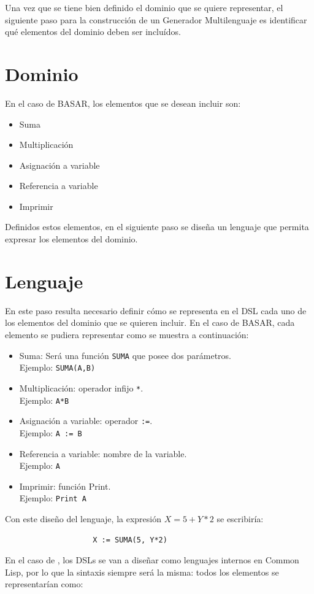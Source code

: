 Una vez que se tiene bien definido el dominio que se quiere representar, el siguiente paso para la construcción de un Generador Multilenguaje es identificar qué elementos del dominio deben ser incluídos.

\section{Dominio}

En el caso de BASAR, los elementos que se desean incluir son: 
\begin{itemize}
\item Suma
\item Multiplicación
\item Asignación a variable
\item Referencia a variable
\item Imprimir
\end{itemize}
Definidos estos elementos, en el siguiente paso se diseña un lenguaje que permita expresar los elementos del dominio.
\section{Lenguaje}
En este paso resulta necesario definir cómo se representa en el DSL cada uno de los elementos del dominio que se quieren incluir. En el caso de BASAR, cada elemento se pudiera representar como se muestra a continuación:
\begin{itemize}
\item   Suma: Será una función \texttt{SUMA} que posee dos parámetros.\\ 
Ejemplo: \texttt{SUMA(A,B)} 
\item   Multiplicación: operador infijo \texttt{*}.\\ Ejemplo: \texttt{A*B}
\item Asignación a variable: operador \texttt{:=}.\\
 Ejemplo: \texttt{A := B}
\item Referencia a variable: nombre de la variable.\\
 Ejemplo: \texttt{A}
\item Imprimir: función Print.\\ 
Ejemplo: \texttt{Print A}
\end{itemize}
Con este diseño del lenguaje, la expresión $X = 5 + Y * 2$ se escribiría: 
\begin{verbatim}
                    X := SUMA(5, Y*2) 
\end{verbatim}
En el caso de \gagm, los DSLs se van a diseñar como lenguajes internos en Common Lisp, por lo que la sintaxis siempre será la misma: todos los elementos se representarían como:

